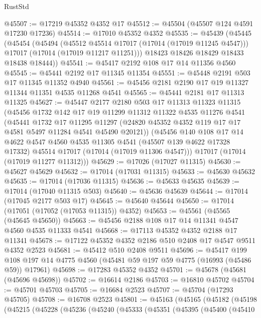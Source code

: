 \begin{lexlean}{RustStd}
\begin{coremodule}
{\begin{coremodule}
{{{{{{{{{{{{{{{{{{{{{{{{{{{{{{{{{{{{{{{{{{{{{{{{{{{{{{{@45507 := @17219 @45352 @4352 @17
@45512 := @45504 (@45507 @124 @4591 @17230 @17236)
@45514 := @17010 @45352 @4352
@45535 := @45439
    (@45445
      (@45454
        (@45494
          (@45512 @45514 @17017 (@17014 (@17019 @11245 @4547)))
          @17017
          (@17014 (@17019 @11217 @11251)))
        @18423
        @18426
        @18429
        @18433
        @18438
        @18444))
@45541 := @45417 @2192 @108 @17 @14 @11356 @4560
@45545 := @45441 @2192 @17 @11345 @11354
@45551 := @45448 @2191 @503 @17 @11345 @11352 @4940
@45561 := @45456 @2181 @2190 @17 @19 @11327 @11344 @11351 @4535 @11268 @4541
@45565 := @45441 @2181 @17 @11313 @11325
@45627 := @45447
    @2177
    @2180
    @503
    @17
    @11313
    @11323
    @11315
    (@45456
      @1732
      @142
      @17
      @19
      @11299
      @11312
      @11322
      @4535
      @11276
      @4541
      (@45441
        @1732
        @17
        @11295
        @11297
        (@24820 @45352 @4352 @119 @17 @17 @4581 @5497 @11284 @4541 @45490 @20121))
      (@45456
        @140
        @108
        @17
        @14
        @4622
        @4547
        @4560
        @4535
        @11305
        @4541
        (@45507 @139 @4622 @17328 @17332)
        @45514
        @17017
        (@17014 (@17019 @11306 @4547)))
      @17017
      (@17014 (@17019 @11277 @11312)))
@45629 := @17026 (@17027 @11315)
@45630 := @45627 @45629
@45632 := @17014 (@17031 @11315)
@45633 := @45630 @45632
@45635 := @17014 (@17036 @11315)
@45636 := @45633 @45635
@45639 := @17014 (@17040 @11315 @503)
@45640 := @45636 @45639
@45644 := @17014 (@17045 @2177 @503 @17)
@45645 := @45640 @45644
@45650 := @17014 (@17051 (@17052 (@17053 @11315)) @4352)
@45653 := @45561 (@45565 (@45645 @45650))
@45663 := @45456 @2188 @108 @17 @14 @11341 @4547 @4560 @4535 @11333 @4541
@45668 := @17113 @45352 @4352 @2188 @17 @11341
@45678 := @17122 @45352 @4352 @2186 @510 @2408 @17 @4547 @9511 @4352 @2523
@45681 := @45412 @510 @2408 @9511
@45696 := @45417
    @199
    @108
    @197
    @14
    @4775
    @4560
    (@45481 @59 @197 @59 @4775 (@16993 (@45486 @59)) @17961)
@45698 := @17283 @45352 @4352
@45701 := @45678 (@45681 (@45696 @45698))
@45702 := @16614 @2186
@45703 := @16810 @45702
@45704 := @45701 @45703
@45705 := @16684 @2523
@45707 := @45704 (@17293 @45705)
@45708 := @16708 @2523
@45801 := @45163
    (@45165
      (@45182
        (@45198
          (@45215
            (@45228
              (@45236
                (@45240
                  (@45333
                    (@45351
                      (@45395
                        (@45400
                          (@45410
}}}}}}}}}}}}}}}}}}}}}}}}}}}}}}}}}}}}}}}}}}}}}}}}}}}}}}}
\end{coremodule}}
\end{coremodule}
\end{lexlean}
